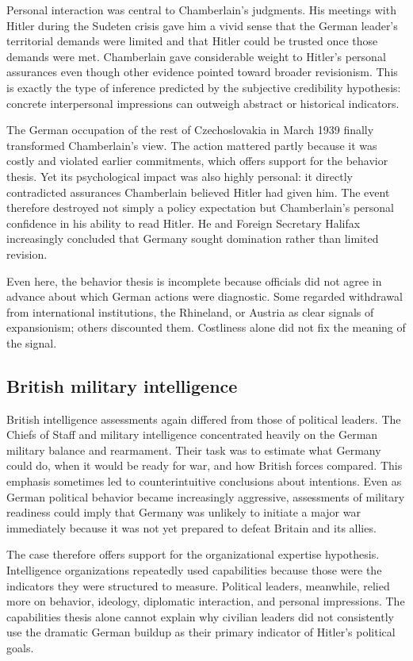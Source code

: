 Personal interaction was central to Chamberlain's judgments. His meetings with Hitler during the Sudeten crisis gave him a vivid sense that the German leader's territorial demands were limited and that Hitler could be trusted once those demands were met. Chamberlain gave considerable weight to Hitler's personal assurances even though other evidence pointed toward broader revisionism. This is exactly the type of inference predicted by the subjective credibility hypothesis: concrete interpersonal impressions can outweigh abstract or historical indicators.

The German occupation of the rest of Czechoslovakia in March 1939 finally transformed Chamberlain's view. The action mattered partly because it was costly and violated earlier commitments, which offers support for the behavior thesis. Yet its psychological impact was also highly personal: it directly contradicted assurances Chamberlain believed Hitler had given him. The event therefore destroyed not simply a policy expectation but Chamberlain's personal confidence in his ability to read Hitler. He and Foreign Secretary Halifax increasingly concluded that Germany sought domination rather than limited revision.

Even here, the behavior thesis is incomplete because officials did not agree in advance about which German actions were diagnostic. Some regarded withdrawal from international institutions, the Rhineland, or Austria as clear signals of expansionism; others discounted them. Costliness alone did not fix the meaning of the signal.

\subsection{British military intelligence}

British intelligence assessments again differed from those of political leaders. The Chiefs of Staff and military intelligence concentrated heavily on the German military balance and rearmament. Their task was to estimate what Germany could do, when it would be ready for war, and how British forces compared. This emphasis sometimes led to counterintuitive conclusions about intentions. Even as German political behavior became increasingly aggressive, assessments of military readiness could imply that Germany was unlikely to initiate a major war immediately because it was not yet prepared to defeat Britain and its allies.

The case therefore offers support for the organizational expertise hypothesis. Intelligence organizations repeatedly used capabilities because those were the indicators they were structured to measure. Political leaders, meanwhile, relied more on behavior, ideology, diplomatic interaction, and personal impressions. The capabilities thesis alone cannot explain why civilian leaders did not consistently use the dramatic German buildup as their primary indicator of Hitler's political goals.

